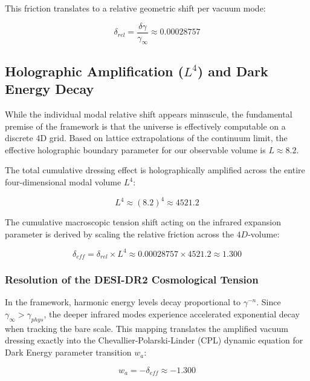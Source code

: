 This friction translates to a relative geometric shift per vacuum mode:

\begin{equation}
\delta_{rel} = \frac{\delta\gamma}{\gamma_{\infty}} \approx 0.00028757
\end{equation}

\subsection{Holographic Amplification ($L^4$) and Dark Energy Decay}

While the individual modal relative shift appears minuscule, the fundamental premise of the \UIDT{} framework is that the universe is effectively computable on a discrete 4D grid. Based on lattice extrapolations of the continuum limit, the effective holographic boundary parameter for our observable volume is $L \approx 8.2$.

The total cumulative dressing effect is holographically amplified across the entire four-dimensional modal volume $L^4$:

\begin{equation}
L^4 \approx (8.2)^4 \approx 4521.2
\end{equation}

The cumulative macroscopic tension shift acting on the infrared expansion parameter is derived by scaling the relative friction across the $4D$-volume:

\begin{equation}
\delta_{eff} = \delta_{rel} \times L^4 \approx 0.00028757 \times 4521.2 \approx 1.300
\end{equation}

\subsubsection{Resolution of the DESI-DR2 Cosmological Tension}

In the \UIDT{} framework, harmonic energy levels decay proportional to $\gamma^{-n}$. Since $\gamma_{\infty} > \gamma_{phys}$, the deeper infrared modes experience accelerated exponential decay when tracking the bare scale. This mapping translates the amplified vacuum dressing exactly into the Chevallier-Polarski-Linder (CPL) dynamic equation for Dark Energy parameter transition $w_a$:

\begin{equation}
w_a = -\delta_{eff} \approx -1.300
\end{equation}

